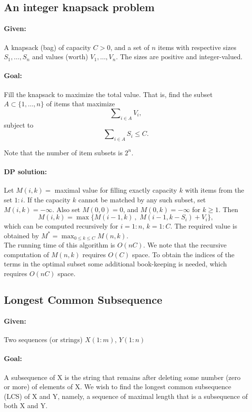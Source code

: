 \subsection{An integer knapsack problem}

\paragraph{Given:}   A knapsack (bag) of capacity $C > 0$, and a set of $n$ items with respective sizes ${S_1}, \ldots ,{S_n}$ and values (worth) ${V_1}, \ldots ,{V_n}$. The sizes are positive and integer-valued.
\paragraph{Goal:}  Fill the knapsack to maximize the total value. That is, find the subset $A \subset \{ 1, \ldots ,n\} $ of items that maximize \[\sum\nolimits_{i \in A} {{V_i}} ,\] subject to  \[\sum\nolimits_{i \in A} {{S_i}}  \le C.\]

Note that the number of item subsets is ${2^n}$.

\paragraph{DP solution:}
Let $M(i,k) = $ maximal value for filling exactly capacity $k$ with items from the set $1:i$.
If the capacity $k$ cannot be matched by any such subset, set $M(i,k) =  - \infty $.
Also set $M(0,0) = 0$, and  $M(0,k) =  - \infty $ for $k \ge 1$.  Then
$$M(i,k) = \max \{ M(i - 1,k)\,,\,\,M(i - 1,k - {S_i}) + {V_i}\} ,$$
which can be computed recursively for $i = 1:n$,  $k = 1:C$. The required value is obtained by    $M^* = {\max _{0 \le k \le C}}M(n,k)$.
\\
The running time of this algorithm is $O(nC)$.  We note that the recursive computation of $M(n,k)$ requires $O(C)$ space. To obtain the indices of the terms in the optimal subset some additional book-keeping is needed, which requires $O(nC)$  space.

\subsection{Longest Common Subsequence}\label{ss:LCS}
\paragraph{Given: } Two sequences (or strings) $X(1:m)$, $Y(1:n)$
\paragraph{Goal:}   A subsequence of X is the string that remains after deleting some number (zero or more) of elements of X.  We wish to find the longest common subsequence (LCS) of X and Y, namely, a sequence of maximal length that is a subsequence of both X and Y.

